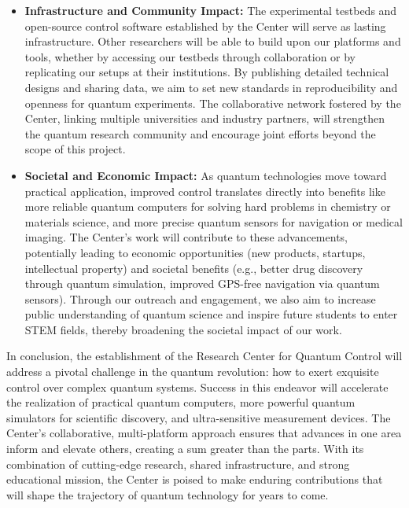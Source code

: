 \documentclass[11pt]{article}
\begin{document}
\begin{itemize}
   \item \textbf{Infrastructure and Community Impact:} The experimental testbeds and open-source control software established by the Center will serve as lasting infrastructure. Other researchers will be able to build upon our platforms and tools, whether by accessing our testbeds through collaboration or by replicating our setups at their institutions. By publishing detailed technical designs and sharing data, we aim to set new standards in reproducibility and openness for quantum experiments. The collaborative network fostered by the Center, linking multiple universities and industry partners, will strengthen the quantum research community and encourage joint efforts beyond the scope of this project.
   \item \textbf{Societal and Economic Impact:} As quantum technologies move toward practical application, improved control translates directly into benefits like more reliable quantum computers for solving hard problems in chemistry or materials science, and more precise quantum sensors for navigation or medical imaging. The Center’s work will contribute to these advancements, potentially leading to economic opportunities (new products, startups, intellectual property) and societal benefits (e.g., better drug discovery through quantum simulation, improved GPS-free navigation via quantum sensors). Through our outreach and engagement, we also aim to increase public understanding of quantum science and inspire future students to enter STEM fields, thereby broadening the societal impact of our work.
\end{itemize}

In conclusion, the establishment of the Research Center for Quantum Control will address a pivotal challenge in the quantum revolution: how to exert exquisite control over complex quantum systems. Success in this endeavor will accelerate the realization of practical quantum computers, more powerful quantum simulators for scientific discovery, and ultra-sensitive measurement devices. The Center’s collaborative, multi-platform approach ensures that advances in one area inform and elevate others, creating a sum greater than the parts. With its combination of cutting-edge research, shared infrastructure, and strong educational mission, the Center is poised to make enduring contributions that will shape the trajectory of quantum technology for years to come.
\end{document}
